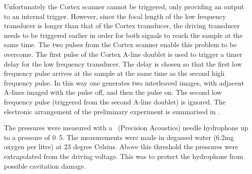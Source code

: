 Unfortunately the Cortex scanner cannot be triggered,
only providing an output to an internal trigger.
However, since the focal length of the low frequency transducer is longer than that
of the Cortex transducer,
the driving transducer needs to be triggered earlier in order for
both signals to reach the sample at the same time.
%
The two pulses from the Cortex scanner enable this problem to be overcome.
The first pulse of the Cortex A-line doublet is used to trigger 
a timer delay for the low frequency transducer.
The delay is chosen  so that the first low frequency pulse arrives at the
sample at the same time as the second high frequency pulse.
In this way one  generates two interleaved images, with adjacent A-lines
imaged with the pulse off, and then the pulse on.
The second low frequency pulse  (triggered from the second
A-line doublet) is ignored.
The electronic arrangement of the preliminary experiment is summarised in \figref{}.

The pressures were measured with a \hydrophone\ (Precision Acoustics) needle hydrophone up to a pressure of 
\unit{0.5}\mega\pascal.  
The measurements were made in degassed water (6.2mg oxygen per litre) at 23 degree Celsius.
Above this threshold the pressures were extrapolated from the driving voltage.  
This was to protect the hydrophone from possible cavitation damage.




